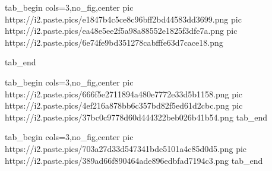  
 
 
 
 
\qqSecCmtScr

\ifcmt
  tab_begin cols=3,no_fig,center
     pic https://i2.paste.pics/e1847b4c5ce8c96bff2bd44583dd3699.png
     pic https://i2.paste.pics/ea48e5ee2f5a98a88552e1825f3dfe7a.png
     pic https://i2.paste.pics/6e74fe9bd351278cabfffe63d7cace18.png

  tab_end
\fi

\ifcmt
  tab_begin cols=3,no_fig,center
    pic https://i2.paste.pics/666f5e2711894a480e7772e33d5b1158.png
    pic https://i2.paste.pics/4ef216a878bb6c357bd82f5ed61d2cbc.png
    pic https://i2.paste.pics/37bc0c9778d60d444322beb026b41b54.png
  tab_end
\fi

\ifcmt
  tab_begin cols=3,no_fig,center
	  pic https://i2.paste.pics/703a27d33d547341bde5101a4c85d0d5.png
    pic https://i2.paste.pics/389ad66f890464ade896edbfad7194c3.png
  tab_end
\fi

